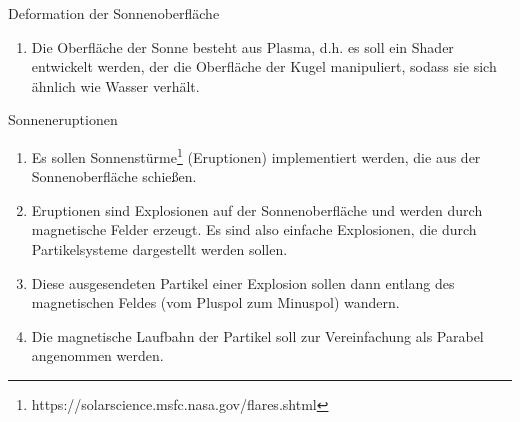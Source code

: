 \documentclass{article}
\begin{document}
\begin{enumerate}
    {\bfseries\large\item Deformation der Sonnenoberfläche}
    \begin{enumerate}
      \item Die Oberfläche der Sonne besteht aus Plasma, d.h. es soll ein Shader
        entwickelt werden, der die Oberfläche der Kugel manipuliert, sodass sie
        sich ähnlich wie Wasser verhält.
    \end{enumerate}

    \vspace{0.5cm}

    {\bfseries\large\item Sonneneruptionen}
    \begin{enumerate}
      \item Es sollen
        Sonnenstürme\footnote{https://solarscience.msfc.nasa.gov/flares.shtml}
        (Eruptionen) implementiert werden, die aus der Sonnenoberfläche
        schießen.
      \item Eruptionen sind Explosionen auf der Sonnenoberfläche und werden
        durch magnetische Felder erzeugt. Es sind also einfache Explosionen, die
        durch Partikelsysteme dargestellt werden sollen.
      \item Diese ausgesendeten Partikel einer Explosion sollen dann entlang des
        magnetischen Feldes (vom Pluspol zum Minuspol) wandern.
      \item Die magnetische Laufbahn der Partikel soll zur Vereinfachung als
        Parabel angenommen werden.
    \end{enumerate}

  \end{enumerate}
\end{document}
